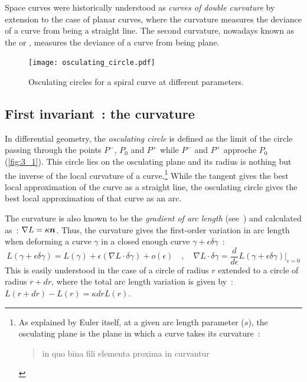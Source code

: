 Space curves were historically understood as \emph{curves of double curvature} by extension to the case of planar curves, where the curvature measures the deviance of a curve from being a straight line. The second curvature, nowadays known as the  or , measures the deviance of a curve from being plane. 


\begin{figure}[t]
	\centering
	\texttt{[image: osculating\_circle.pdf]}
	\caption{Osculating circles for a spiral curve at different parameters.}
	\label{fig:3_2}
\end{figure}

\subsection{First invariant~: the curvature}\label{sec:curvature}
In differential geometry, the \emph{osculating circle} is defined as the limit of the circle passing through the points $P^-$, $P_0$ and $P^+$ while $P^-$ and $P^+$ approche $P_0$ (\cref{fig:3_1}). This circle lies on the osculating plane and its radius is nothing but the inverse of the local curvature of a curve.\footnote{ As explained by Euler itself, at a given arc length parameter ($s$), the osculating plane is the plane in which a curve takes its curvature~: \blockcquote[p.364]{Euler1775}{in quo bina fili elementa proxima in curvantur}.} While the tangent gives the best local approximation of the curve as a straight line, the osculating circle gives the best local approximation of that curve as an arc.

The curvature is also known to be the \emph{gradient of arc length} (see~\cite[p.4]{Vouga2014}) and calculated as~: $\nabla{L} = \kappa \boldsymbol{n}$. Thus, the curvature gives the first-order variation in arc length when deforming a curve $\gamma$ in a closed enough curve $\gamma + \epsilon \delta\gamma$~:
\begin{equation}
	L(\gamma + \epsilon \delta\gamma) = L(\gamma) + \epsilon (\nabla L \cdot \delta\gamma) + o(\epsilon)
	\quad , \quad
	\nabla L \cdot \delta\gamma
	= \frac{d}{d\epsilon}L(\gamma+\epsilon \delta \gamma)\Bigr|_{\epsilon = 0}
\end{equation}
This is easily understood in the case of a circle of radius $r$ extended to a circle of radius $r+dr$, where the total arc length variation is given by~: 
$L(r + dr) - L(r) = \kappa dr L(r) $.

